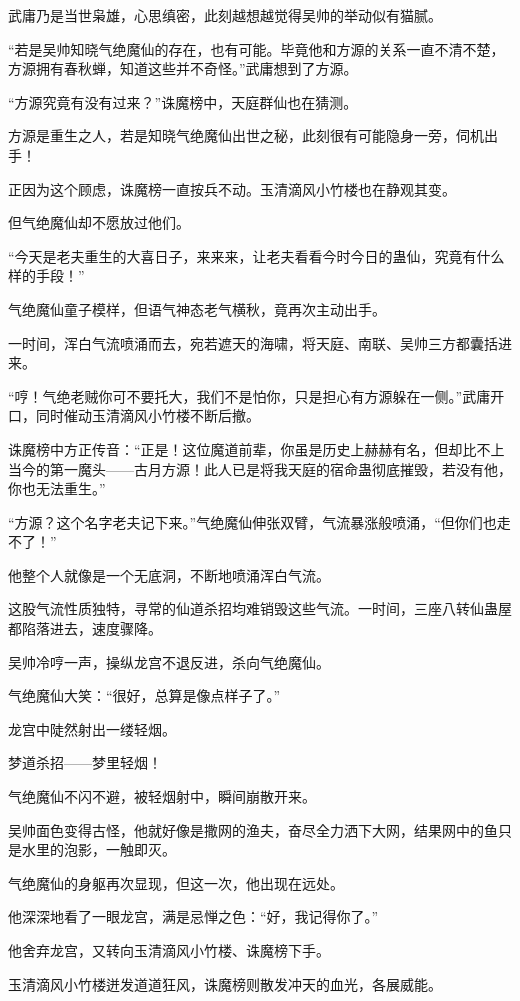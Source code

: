 \begin{this_body}
武庸乃是当世枭雄，心思缜密，此刻越想越觉得吴帅的举动似有猫腻。

“若是吴帅知晓气绝魔仙的存在，也有可能。毕竟他和方源的关系一直不清不楚，方源拥有春秋蝉，知道这些并不奇怪。”武庸想到了方源。

“方源究竟有没有过来？”诛魔榜中，天庭群仙也在猜测。

方源是重生之人，若是知晓气绝魔仙出世之秘，此刻很有可能隐身一旁，伺机出手！

正因为这个顾虑，诛魔榜一直按兵不动。玉清滴风小竹楼也在静观其变。

但气绝魔仙却不愿放过他们。

“今天是老夫重生的大喜日子，来来来，让老夫看看今时今日的蛊仙，究竟有什么样的手段！”

气绝魔仙童子模样，但语气神态老气横秋，竟再次主动出手。

一时间，浑白气流喷涌而去，宛若遮天的海啸，将天庭、南联、吴帅三方都囊括进来。

“哼！气绝老贼你可不要托大，我们不是怕你，只是担心有方源躲在一侧。”武庸开口，同时催动玉清滴风小竹楼不断后撤。

诛魔榜中方正传音：“正是！这位魔道前辈，你虽是历史上赫赫有名，但却比不上当今的第一魔头——古月方源！此人已是将我天庭的宿命蛊彻底摧毁，若没有他，你也无法重生。”

“方源？这个名字老夫记下来。”气绝魔仙伸张双臂，气流暴涨般喷涌，“但你们也走不了！”

他整个人就像是一个无底洞，不断地喷涌浑白气流。

这股气流性质独特，寻常的仙道杀招均难销毁这些气流。一时间，三座八转仙蛊屋都陷落进去，速度骤降。

吴帅冷哼一声，操纵龙宫不退反进，杀向气绝魔仙。

气绝魔仙大笑：“很好，总算是像点样子了。”

龙宫中陡然射出一缕轻烟。

梦道杀招——梦里轻烟！

气绝魔仙不闪不避，被轻烟射中，瞬间崩散开来。

吴帅面色变得古怪，他就好像是撒网的渔夫，奋尽全力洒下大网，结果网中的鱼只是水里的泡影，一触即灭。

气绝魔仙的身躯再次显现，但这一次，他出现在远处。

他深深地看了一眼龙宫，满是忌惮之色：“好，我记得你了。”

他舍弃龙宫，又转向玉清滴风小竹楼、诛魔榜下手。

玉清滴风小竹楼迸发道道狂风，诛魔榜则散发冲天的血光，各展威能。


\end{this_body}
